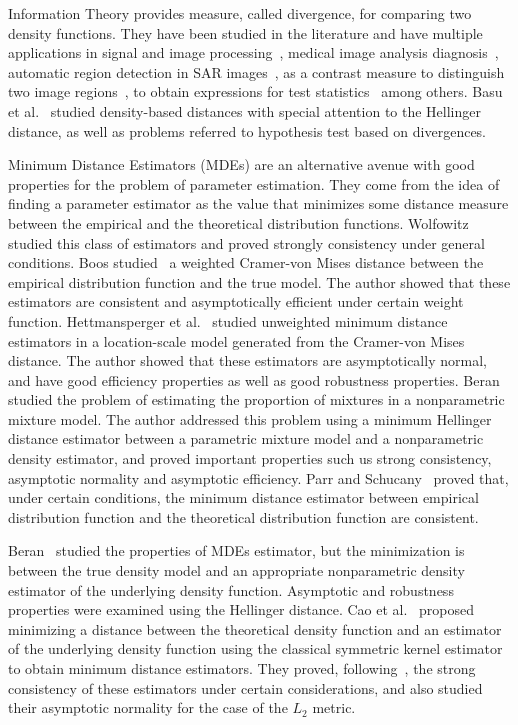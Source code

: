 \documentclass[technote,onecolumn,draftcls,12pt]{IEEEtran}
\numberwithin{equation}{section}
\begin{document}
Information Theory provides measure, called divergence, for comparing two density functions. 
They have been studied in the literature and have multiple applications in 
signal and image processing~\cite{4218961}, 
medical image analysis diagnosis~\cite{5599869}, 
automatic region detection in SAR images~\cite{EdgeDetectionDistancesEntropiesJSTARS,SARSegmentationLevelSetGA0}, 
as a contrast measure to distinguish two image regions~\cite{Nascimento2009}, 
to obtain expressions for test statistics~\cite{ClassificationPolSARSegmentsMinimizationWishartDistances} among others.
Basu et al.~\cite{Basu2011} studied density-based distances with special attention to the Hellinger distance, as well as problems referred to hypothesis test based on divergences.

Minimum Distance Estimators (MDEs) are an alternative avenue with good properties for the problem of parameter estimation.
They come from the idea of finding a parameter estimator as the value that minimizes some  distance measure between the empirical and the theoretical distribution functions. 
Wolfowitz~\cite{wolfowitz1953,wolfowitz1957} studied this class of estimators and proved strongly consistency under general conditions. 
Boos studied~\cite{Boos1981} a weighted Cramer-von Mises distance between the empirical distribution function and the true model. 
The author showed that these estimators are consistent and asymptotically efficient under certain weight function. 
Hettmansperger et al.~\cite{HettmanSperger1994} studied unweighted minimum distance estimators in a location-scale model generated from the Cramer-von Mises distance. 
The author showed that these estimators are asymptotically normal, and have good efficiency properties as well as good robustness properties.
Beran ~\cite{beran1977} studied the problem of estimating the proportion of mixtures in a nonparametric mixture model. 
The author addressed this problem using a minimum Hellinger distance estimator between a parametric mixture model and a nonparametric density estimator, and proved important properties such us strong consistency, asymptotic normality and asymptotic efficiency.  
Parr and Schucany~\cite{parr1982} proved that, under certain conditions, the minimum distance estimator between empirical distribution function and the theoretical distribution function are  consistent.

Beran~\cite{beran1977} studied the properties of MDEs estimator, but the minimization is between the true density model and an appropriate nonparametric density estimator of the underlying density function. 
Asymptotic and robustness properties were examined using the Hellinger distance. 
Cao et al.~\cite{cao1995minimum} proposed minimizing a distance between the theoretical density function and an estimator of the underlying density function using the classical symmetric kernel estimator to obtain minimum distance estimators. 
They proved, following~\cite{parr1982}, the strong consistency of these estimators under certain considerations, and also studied their asymptotic normality for the case of the $L_2$ metric.
\end{document}
